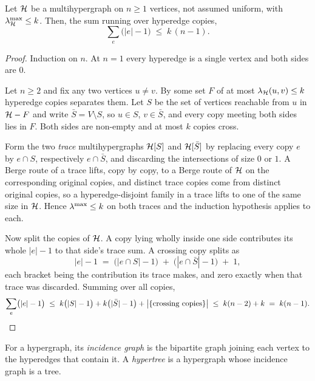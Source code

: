 \begin{lemma}\label{lem:hyper-cut-induction}
Let $\mathcal{H}$ be a multihypergraph on $n \ge 1$ vertices, not assumed uniform, with
$\lambda^{\max}_{\mathcal{H}} \le k$. Then, the sum running over hyperedge copies,
\[
    \sum_{e} \bigl(|e| - 1\bigr) \;\le\; k\,(n-1).
\]
\end{lemma}

\begin{proof}
Induction on $n$. At $n = 1$ every hyperedge is a single vertex and both sides
are $0$.

Let $n \ge 2$ and fix any two vertices $u \ne v$. By 
some set $F$ of at most $\lambda_{\mathcal{H}}(u,v) \le k$ hyperedge copies separates them.
Let $S$ be the set of vertices reachable from $u$ in $\mathcal{H} - F$ and write
$\bar S = V \setminus S$, so $u \in S$, $v \in \bar S$, and every copy meeting
both sides lies in $F$. Both sides are non-empty and at most $k$ copies cross.

Form the two \emph{trace} multihypergraphs $\mathcal{H}[S]$ and $\mathcal{H}[\bar S]$ by
replacing every copy $e$ by $e \cap S$, respectively $e \cap \bar S$, and
discarding the intersections of size $0$ or $1$. A Berge route of a trace lifts,
copy by copy, to a Berge route of $\mathcal{H}$ on the corresponding original copies,
and distinct trace copies come from distinct original copies, so a
hyperedge-disjoint family in a trace lifts to one of the same size in $\mathcal{H}$.
Hence $\lambda^{\max} \le k$ on both traces and the induction hypothesis applies to
each.

Now split the copies of $\mathcal{H}$. A copy lying wholly inside one side contributes
its whole $|e| - 1$ to that side's trace sum. A crossing copy splits as
\[
    |e| - 1 \;=\; \bigl(|e \cap S| - 1\bigr)
              \;+\; \bigl(|e \cap \bar S| - 1\bigr) \;+\; 1,
\]
each bracket being the contribution its trace makes, and zero exactly when that
trace was discarded. Summing over all copies,
\[
    \sum_e \bigl(|e|-1\bigr)
    \;\le\; k\bigl(|S| - 1\bigr) + k\bigl(|\bar S| - 1\bigr)
            + \bigl|\{\text{crossing copies}\}\bigr|
    \;\le\; k(n-2) + k \;=\; k(n-1). \qedhere
\]
\end{proof}

For a hypergraph, its \emph{incidence graph} is the bipartite graph joining
each vertex to the hyperedges that contain it. A \emph{hypertree} is a
hypergraph whose incidence graph is a tree.


